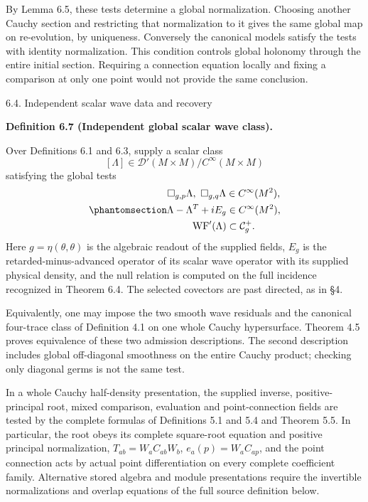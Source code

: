\documentclass[
  english,
  11pt,
  reqno]{amsart}
\makeatletter
\newcommand{\paperstatementsection}{\@startsection{subsection}{2}%
  \z@{.5\linespacing\@plus.7\linespacing}{.35\baselineskip}%
  {\normalfont\bfseries}}
\newcommand{\paperfirststatement}[1]{%
  {\normalfont\bfseries #1\par}%
  \nobreak\@afterindenttrue\@afterheading}
\makeatother
\begin{document}
By Lemma 6.5, these tests determine a global normalization. Choosing
another Cauchy section and restricting that normalization to it gives
the same global map on re-evolution, by uniqueness. Conversely the
canonical models satisfy the tests with identity normalization. This
condition controls global holonomy through the entire initial section.
Requiring a connection equation locally and fixing a comparison at only
one point would not provide the same conclusion.

\protect{}\label{sec:global-independent-scalar-admission}
\paperstatementsection{6.4. Independent scalar wave data and
recovery}\label{independent-scalar-wave-data-and-recovery}
\paperfirststatement{\protect{}\label{def:global-independent-scalar-wave}Definition 6.7 (Independent global scalar wave class).}

Over Definitions 6.1 and 6.3, supply a scalar class \[
[\Lambda]\in\mathcal D'(M\times M)/C^\infty(M\times M)
\] satisfying the global tests
\begin{equation}\protect\phantomsection\label{eq:global-independent-scalar-tests}{\begin{gathered}
\Box_{g,p}\Lambda,\ \Box_{g,q}\Lambda\in C^\infty(M^2), \\
\Lambda-\Lambda^T+iE_g\in C^\infty(M^2), \\
\operatorname{WF}'(\Lambda)\subset\mathcal C_g^+.
\end{gathered}}\end{equation} Here \(g=\eta(\theta,\theta)\) is the algebraic readout
of the supplied fields, \(E_g\) is the retarded-minus-advanced operator
of its scalar wave operator with its supplied physical density, and the
null relation is computed on the full incidence recognized in Theorem
6.4. The selected covectors are past directed, as in §4.

Equivalently, one may impose the two smooth wave residuals and the
canonical four-trace class of Definition 4.1 on one whole Cauchy
hypersurface. Theorem 4.5 proves equivalence of these two admission
descriptions. The second description includes global off-diagonal
smoothness on the entire Cauchy product; checking only diagonal germs is
not the same test.

In a whole Cauchy half-density presentation, the supplied inverse,
positive-principal root, mixed comparison, evaluation and
point-connection fields are tested by the complete formulas of
Definitions 5.1 and 5.4 and Theorem 5.5. In particular, the root obeys
its complete square-root equation and positive principal normalization,
\(T_{ab}=W_aC_{ab}W_b\), \(e_a(p)=W_aC_{ap}\), and the point connection
acts by actual point differentiation on every complete coefficient
family. Alternative stored algebra and module presentations require the
invertible normalizations and overlap equations of the full source
definition below.
\end{document}
